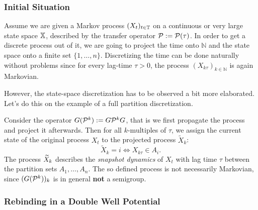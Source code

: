 
\subsubsection*{Initial Situation}

Assume we are given a Markov process $(X_t)_{t \in \mathbb{T}}$ on a continuous or very large state space $\mathbb{X}$, described by the transfer operator $\mathcal{P} := \mathcal{P}(\tau)$.
In order to get a discrete process out of it, we are going to project the time onto $\mathbb{N}$ and the state space onto a finite set $\{1,\dots,n\}$.
Discretizing the time can be done naturally without problems since for every lag-time $\tau > 0$, the process $(X_{k\tau})_{k\in \mathbb{N}}$ is again Markovian. 

However, the state-space discretization has to be observed a bit more elaborated.
Let's do this on the example of a full partition discretization.


Consider the operator $G(\mathcal{P}^k) := G\mathcal{P}^k G$, that is we first propagate the process and project it afterwards. Then for all $k$-multiples of $\tau$, we assign the current state of the original process $X_t$ to the projected process $\widetilde{X}_k$:
\begin{equation*}
\widetilde{X}_k = i \Leftrightarrow X_{k\tau} \in A_i.
\end{equation*}
The process $\widetilde{X}_k$ describes the \textit{snapshot dynamics} of $X_t$ with lag time $\tau$ between the partition sets $A_1,\dots,A_n$.
The so defined process is not necessarily Markovian, since $(G(\mathcal{P}^k))_k$ is in general \textbf{not} a semigroup. 

\subsubsection*{Rebinding in a Double Well Potential}

